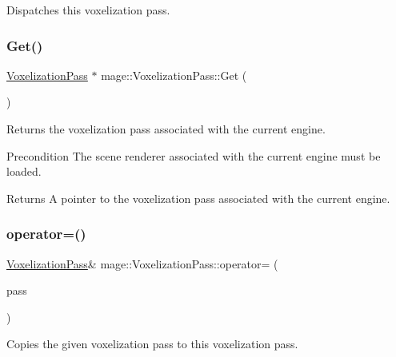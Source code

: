 Dispatches this voxelization pass. \hypertarget{classmage_1_1_voxelization_pass_a2f7a0a3c69d008f241a46b4f333add37}{}\label{classmage_1_1_voxelization_pass_a2f7a0a3c69d008f241a46b4f333add37} 
\subsubsection{\texorpdfstring{Get()}{Get()}}
{\footnotesize\ttfamily \hyperlink{classmage_1_1_voxelization_pass}{Voxelization\+Pass} $\ast$ mage\+::\+Voxelization\+Pass\+::\+Get (\begin{DoxyParamCaption}{ }\end{DoxyParamCaption})\hspace{0.3cm}{\ttfamily [static]}}

Returns the voxelization pass associated with the current engine.

\begin{DoxyPrecond}{Precondition}
The scene renderer associated with the current engine must be loaded. 
\end{DoxyPrecond}
\begin{DoxyReturn}{Returns}
A pointer to the voxelization pass associated with the current engine. 
\end{DoxyReturn}
\hypertarget{classmage_1_1_voxelization_pass_a0ecd5331deb5134ea903fb1af566dbb7}{}\label{classmage_1_1_voxelization_pass_a0ecd5331deb5134ea903fb1af566dbb7} 
\subsubsection{\texorpdfstring{operator=()}{operator=()}\hspace{0.1cm}{\footnotesize\ttfamily [1/2]}}
{\footnotesize\ttfamily \hyperlink{classmage_1_1_voxelization_pass}{Voxelization\+Pass}\& mage\+::\+Voxelization\+Pass\+::operator= (\begin{DoxyParamCaption}\item[{const \hyperlink{classmage_1_1_voxelization_pass}{Voxelization\+Pass} \&}]{pass }\end{DoxyParamCaption})\hspace{0.3cm}{\ttfamily [delete]}}

Copies the given voxelization pass to this voxelization pass.


